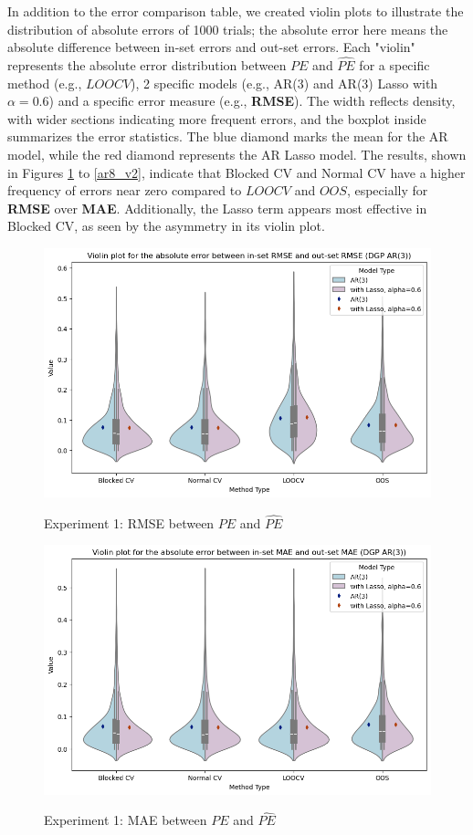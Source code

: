 \documentclass[12pt, oneside]{amsart}
\theoremstyle{definition}
\theoremstyle{remark}
\numberwithin{equation}{section}
\begin{document}
In addition to the error comparison table, we created violin plots to illustrate the distribution of absolute errors of 1000 trials; the absolute error here means the absolute difference between in-set errors and out-set errors. Each "violin" represents the absolute error distribution between $PE$ and $\hat{PE}$ for a specific method (e.g., $LOOCV$), 2 specific models (e.g., AR(3) 
and AR(3) Lasso with $\alpha = 0.6$) and a specific error measure (e.g., \textbf{RMSE}). The width reflects density, with wider sections indicating more frequent errors, and the boxplot inside summarizes the error statistics. The blue diamond marks the mean for the AR model, while the red diamond represents the AR Lasso model. The results, shown in Figures \ref{ar3_v1} to \ref{ar8_v2}, indicate that Blocked CV and Normal CV have a higher frequency of errors near zero compared to $LOOCV$ and $OOS$, especially for \textbf{RMSE} over \textbf{MAE}. Additionally, the Lasso term appears most effective in Blocked CV, as seen by the asymmetry in its violin plot.

\begin{figure}[hbt!]
    \caption{Experiment 1: RMSE between $PE$ and $\hat{PE}$}
    \centering
    \includegraphics[scale=0.5]{Report/Figures/ar3_violin_rmse.jpg}
    \label{ar3_v1}
\end{figure}
\FloatBarrier

\begin{figure}[hbt!]
    \caption{Experiment 1: MAE between $PE$ and $\hat{PE}$}
    \centering
    \includegraphics[scale=0.5]{Report/Figures/ar3_violin_mae.jpg}
    \label{ar3_v2}
\end{figure}
\FloatBarrier
\end{document}
